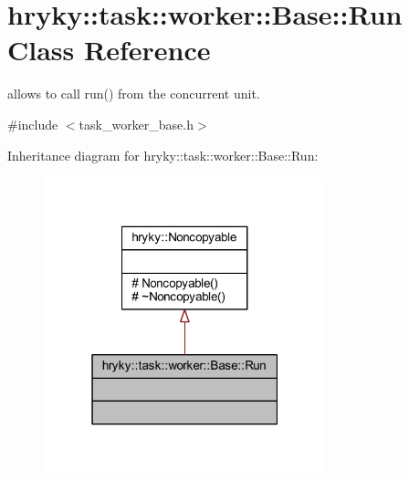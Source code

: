 \hypertarget{classhryky_1_1task_1_1worker_1_1_base_1_1_run}{\section{hryky\-:\-:task\-:\-:worker\-:\-:Base\-:\-:Run Class Reference}
\label{classhryky_1_1task_1_1worker_1_1_base_1_1_run}
}


allows to call run() from the concurrent unit.  




{\ttfamily \#include $<$task\-\_\-worker\-\_\-base.\-h$>$}



Inheritance diagram for hryky\-:\-:task\-:\-:worker\-:\-:Base\-:\-:Run\-:\nopagebreak
\begin{figure}[H]
\begin{center}
\leavevmode
\includegraphics[width=232pt]{classhryky_1_1task_1_1worker_1_1_base_1_1_run__inherit__graph}
\end{center}
\end{figure}
